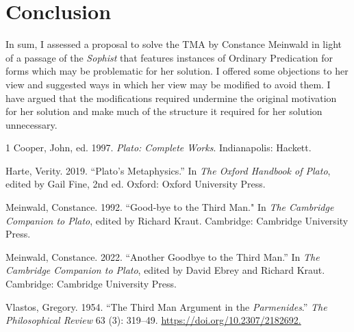 \section{Conclusion}

In sum, I assessed a proposal to solve the TMA by Constance Meinwald in light of a passage of the \textit{Sophist} that features instances of Ordinary Predication for forms which may be problematic for her solution. I offered some objections to her view and suggested ways in which her view may be modified to avoid them. I have argued that the modifications required undermine the original motivation for her solution and make much of the structure it required for her solution unnecessary. 


\begin{hangparas}{\hangingindent}{1}
Cooper, John, ed. 1997. \textit{Plato: Complete Works}. Indianapolis: Hackett.

Harte, Verity. 2019. ``Plato's Metaphysics.'' In \textit{The Oxford Handbook of Plato}, edited by Gail Fine, 2nd ed. Oxford: Oxford University Press.

Meinwald, Constance. 1992. ``Good-bye to the Third Man." In \textit{The Cambridge Companion to Plato}, edited by Richard Kraut. Cambridge: Cambridge University Press.

Meinwald, Constance. 2022. ``Another Goodbye to the Third Man.” In \textit{The Cambridge Companion to Plato}, edited by David Ebrey and Richard Kraut. Cambridge: Cambridge University Press. 

Vlastos, Gregory. 1954. ``The Third Man Argument in the \textit{Parmenides}.” \textit{The Philosophical Review} 63 (3): 319--49. 
\url{https://doi.org/10.2307/2182692.}
\end{hangparas}